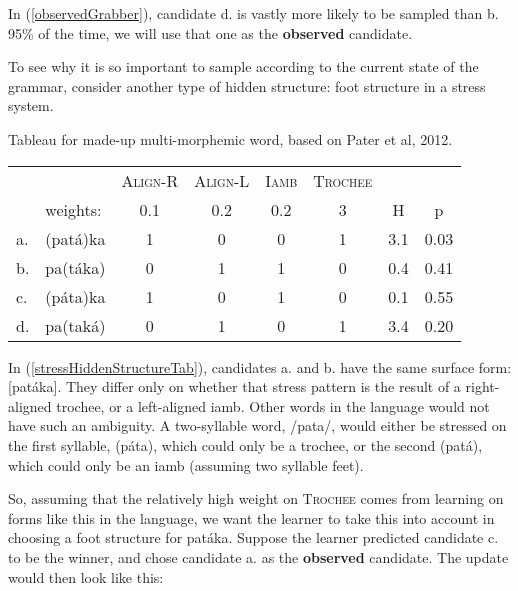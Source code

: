 \documentclass[12]{article}
\begin{document}
  	In (\ref{observedGrabber}), candidate d. is vastly more likely to be sampled than b.  95\% of the time, we will use that one as the {\bf observed} candidate.
  	
  	To see why it is so important to sample according to the current state of the grammar, consider another type of hidden structure: foot structure in a stress system.
  	
  	\begin{exe}
  	\ex\label{stressHiddenStructureTab} Tableau for made-up multi-morphemic word, based on Pater et al, 2012.
  	
  	\begin{tabular}{ll|cccc|cc}
  		
  		 &                  &\textsc{Align-R} 	& \textsc{Align-L} 	& \textsc{Iamb}	& \textsc{Trochee} 	&     &   \\
  		 &       weights:   &		0.1			&		0.2			&		0.2		&		3			& H   & p \\  
  		\hline 
  		a. & (pat\'{a})ka 	&		1			&		0			&		0		&		1			& 3.1 & 0.03 \\
  		b. & pa(t\'{a}ka)   &		0			&		1			&		1		&		0			& 0.4 &	0.41 \\
  		c. & (p\'{a}ta)ka   &		1			&		0			&		1		&		0			& 0.1 &	0.55 \\
  		d. & pa(tak\'{a})	&		0			&		1			&		0		&		1			& 3.4 &	0.20 \\
  	\end{tabular}
  	
  \end{exe}	

	In (\ref{stressHiddenStructureTab}), candidates a. and b. have the same surface form: [pat\'{a}ka].  They differ only on whether that stress pattern is the result of a right-aligned trochee, or a left-aligned iamb.  Other words in the language would not have such an ambiguity.  A two-syllable word, /pata/, would either be stressed on the first syllable, (p\'ata), which could only be a trochee, or the second (pat\'a), which could only be an iamb (assuming two syllable feet).
	
	So, assuming that the relatively high weight on \textsc{Trochee} comes from learning on forms like this in the language, we want the learner to take this into account in choosing a foot structure for pat\'aka.  Suppose the learner predicted candidate c. to be the winner, and chose candidate a. as the {\bf observed} candidate.  The update would then look like this:
	
\end{document}
